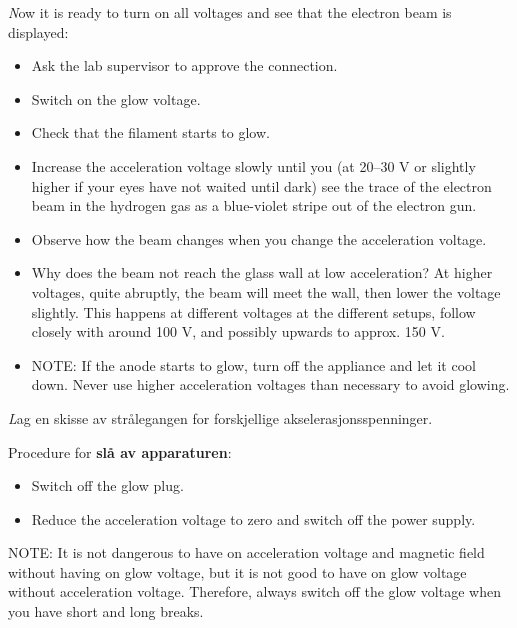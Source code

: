 \documentclass[../Elmag-labhefte-2020.tex]{subfiles}
\begin{document}
{\emph Now it is ready to turn on all voltages and see that the electron beam is displayed:}
\vspace{-4mm}
\begin{itemize}
\item Ask the lab supervisor to approve the connection.
\item Switch on the glow voltage.
\item Check that the filament starts to glow.
\item Increase the acceleration voltage slowly until you (at 20--30 V or slightly higher if your eyes have not waited until dark) see
the trace of the electron beam in the hydrogen gas as a blue-violet stripe out of the electron gun.
\item Observe how the beam changes when you change the acceleration voltage.
\item Why does the beam not reach the glass wall at low acceleration? At higher voltages, quite abruptly, the beam will meet the wall, then lower the voltage slightly. This happens at different voltages at the different setups, follow closely with around 100 V, and possibly upwards to approx. 150 V.
\item NOTE: If the anode starts to glow, turn off the appliance and let it cool down. Never use higher acceleration voltages than necessary to avoid glowing.
\end{itemize}

{\emph Lag en skisse av strålegangen for forskjellige akselerasjonsspenninger.}
%


Procedure for \textbf{slå av apparaturen}:
\vspace{-4mm}
\begin{itemize}
\item Switch off the glow plug.
\item Reduce the acceleration voltage to zero and switch off the power supply.
\end{itemize}
NOTE: It is not dangerous to have on acceleration voltage and magnetic field without having on glow voltage, but it is not good to have on glow voltage without acceleration voltage. Therefore, always switch off the glow voltage when you have short and long breaks.
\end{document}
